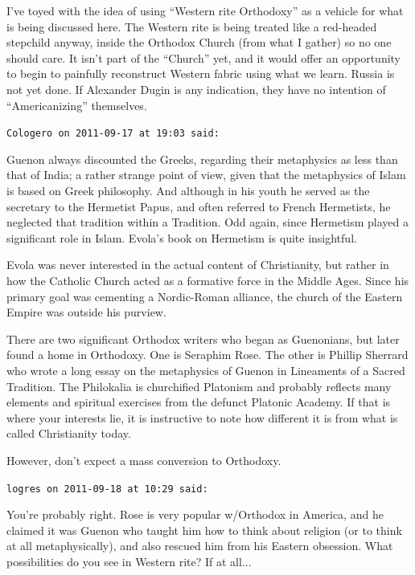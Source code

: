 \begin{footnotesize}
\begin{sffamily}
I've toyed with the idea of using ``Western rite Orthodoxy'' as a vehicle for what is being discussed here. The Western rite is being treated like a red-headed stepchild anyway, inside the Orthodox Church (from what I gather) so no one should care. It isn't part of the ``Church'' yet, and it would offer an opportunity to begin to painfully reconstruct Western fabric using what we learn. Russia is not yet done. If Alexander Dugin is any indication, they have no intention of ``Americanizing'' themselves.

\hfill

\texttt{Cologero on 2011-09-17 at 19:03 said:}

Guenon always discounted the Greeks, regarding their metaphysics as less than that of India; a rather strange point of view, given that the metaphysics of Islam is based on Greek philosophy. And although in his youth he served as the secretary to the Hermetist Papus, and often referred to French Hermetists, he neglected that tradition within a Tradition. Odd again, since Hermetism played a significant role in Islam. Evola's book on Hermetism is quite insightful.

Evola was never interested in the actual content of Christianity, but rather in how the Catholic Church acted as a formative force in the Middle Ages. Since his primary goal was cementing a Nordic-Roman alliance, the church of the Eastern Empire was outside his purview.

There are two significant Orthodox writers who began as Guenonians, but later found a home in Orthodoxy. One is Seraphim Rose. The other is Phillip Sherrard who wrote a long essay on the metaphysics of Guenon in Lineaments of a Sacred Tradition. The Philokalia is churchified Platonism and probably reflects many elements and spiritual exercises from the defunct Platonic Academy. If that is where your interests lie, it is instructive to note how different it is from what is called Christianity today.

However, don't expect a mass conversion to Orthodoxy.

\hfill

\texttt{logres on 2011-09-18 at 10:29 said:}

You're probably right. Rose is very popular w/Orthodox in America, and he claimed it was Guenon who taught him how to think about religion (or to think at all metaphysically), and also rescued him from his Eastern obsession. What possibilities do you see in Western rite? If at all...


\end{sffamily}
\end{footnotesize}
